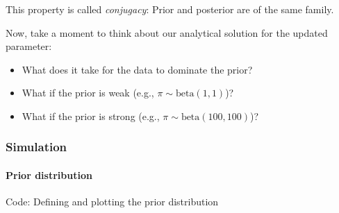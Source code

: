 \documentclass[
  11pt,
]{article}
\providecommand{\tightlist}{%
  \setlength{\itemsep}{0pt}\setlength{\parskip}{0pt}}
\begin{document}
This property is called \emph{conjugacy}: Prior and posterior are of the same family.

Now, take a moment to think about our analytical solution for the updated parameter:

\begin{itemize}
\tightlist
\item
  What does it take for the data to dominate the prior?
\item
  What if the prior is weak (e.g., \(\pi \sim \text{beta}(1,1)\))?
\item
  What if the prior is strong (e.g., \(\pi \sim \text{beta}(100,100)\))?
\end{itemize}

\hypertarget{simulation}{%
\subsubsection{Simulation}\label{simulation}}

\hypertarget{prior-distribution-1}{%
\paragraph{Prior distribution}\label{prior-distribution-1}}

Code: Defining and plotting the prior distribution
\end{document}
